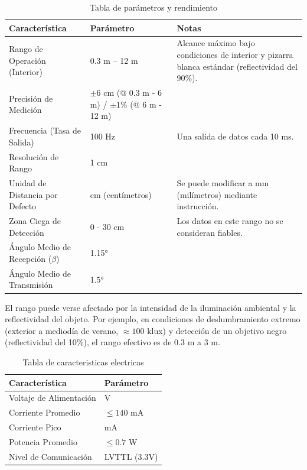 \documentclass[12pt,a4paper]{article}
\begin{document}
\begin{table}[H]
\centering
\begin{tabular}{|p{5cm}|p{5cm}|p{5cm}|}
\hline
\textbf{Característica} & \textbf{Parámetro} & \textbf{Notas} \\
\hline
Rango de Operación (Interior) & 0.3 m -- 12 m & Alcance máximo bajo condiciones de interior y pizarra blanca estándar (reflectividad del 90\%). \\
\hline
Precisión de Medición & $\pm 6$ cm (@ 0.3 m - 6 m) / $\pm 1\%$ (@ 6 m - 12 m) &  \\
\hline
Frecuencia (Tasa de Salida) & 100 Hz & Una salida de datos cada 10 ms. \\
\hline
Resolución de Rango & 1 cm &  \\
\hline
Unidad de Distancia por Defecto & cm (centímetros) & Se puede modificar a mm (milímetros) mediante instrucción. \\
\hline
Zona Ciega de Detección & 0 - 30 cm & Los datos en este rango no se consideran fiables. \\
\hline
Ángulo Medio de Recepción ($\beta$) & 1.15° &  \\
\hline
Ángulo Medio de Transmisión & 1.5° &  \\
\hline
\end{tabular}
\caption{Tabla de parámetros y rendimiento}
\end{table}

El rango puede verse afectado por la intensidad de la iluminación ambiental y la reflectividad del objeto. Por ejemplo, en condiciones de deslumbramiento extremo (exterior a mediodía de verano, $\approx 100$ klux) y detección de un objetivo negro (reflectividad del 10\%), el rango efectivo es de 0.3 m a 3 m.


\begin{table}[H]
\centering
\begin{tabular}{|>{\raggedright}p{5cm}|>{\raggedright\arraybackslash}p{5cm}|}
\hline
\textbf{Característica} & \textbf{Parámetro} \\
\hline
Voltaje de Alimentación & 5 V \\
\hline
Corriente Promedio & $\leq 140$ mA \\
\hline
Corriente Pico & 800 mA \\
\hline
Potencia Promedio & $\leq 0.7$ W \\
\hline
Nivel de Comunicación & LVTTL (3.3V) \\
\hline
\end{tabular}
\caption{Tabla de caracteristicas electricas}
\end{table}
\end{document}
